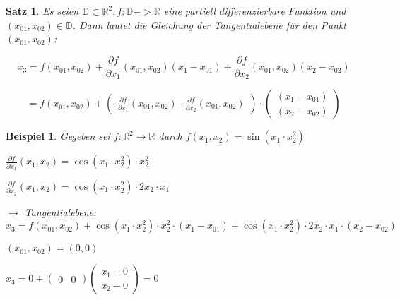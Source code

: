 \documentclass[12pt,a4paper]{scrreprt}
\newtheorem{beispiel}[defi]{Beispiel}
\newtheorem{satz}[defi]{Satz}
\begin{document}
\begin{satz}
Es seien $\mathbb{D} \subset \mathbb{R}^2, f:\mathbb{D}->\mathbb{R}$ eine partiell differenzierbare Funktion und $(x_{01},x_{02})\in\mathbb{D}$. Dann lautet die Gleichung der Tangentialebene für den Punkt $(x_{01},x_{02})$:

\[x_3=f(x_{01},x_{02})+\frac{\partial f}{\partial x_1}(x_{01},x_{02})(x_1-x_{01})+\frac{\partial f}{\partial x_2}(x_{01},x_{02})(x_2-x_{02})\]

\[=f(x_{01},x_{02})+\begin{pmatrix} \frac{\partial f}{\partial x_1} (x_{01},x_{02}) & \frac{\partial f}{\partial x_2}(x_{01},x_{02}) \end{pmatrix} \cdot \begin{pmatrix} (x_1-x_{01})\\ (x_2-x_{02}) \end{pmatrix}\]
\end{satz}

\begin{beispiel}
	Gegeben sei $f:\mathbb{R}^2\to\mathbb{R}$ durch $f(x_1,x_2)=\sin(x_1\cdot x_2^2)$

	$\frac{\partial f}{\partial x_1}(x_1,x_2)=\cos(x_1\cdot x_2^2)\cdot x_2^2$
	
	$\frac{\partial f}{\partial x_2}(x_1,x_2)=\cos(x_1\cdot x_2^2)\cdot 2x_2 \cdot x_1$
	
	$\to$ Tangentialebene: $x_3 = f(x_{01},x_{02}) + \cos(x_1\cdot x_2^2)\cdot x_2^2 \cdot (x_1 - x_{01}) + \cos(x_1\cdot x_2^2)\cdot 2x_2 \cdot x_1 \cdot (x_2 - x_{02})$
	
	$(x_{01},x_{02}) = (0,0)$
	
	$x_3 = 0 + \begin{pmatrix}0 & 0\end{pmatrix} \begin{pmatrix}x_1 - 0 \\ x_2 - 0\end{pmatrix} = 0$
	
\end{beispiel}
\end{document}
